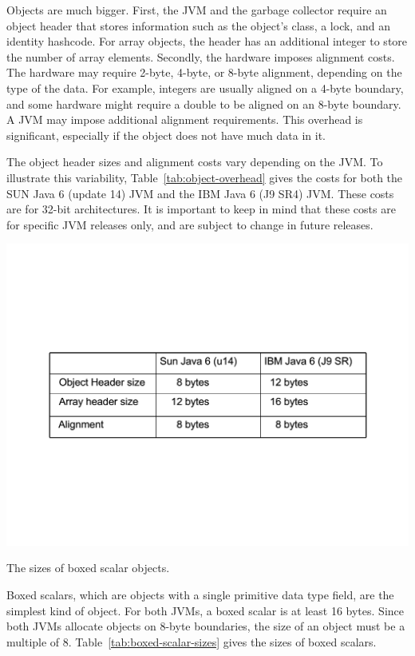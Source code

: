 Objects are much bigger. First, the JVM and the garbage collector require an object header that stores information such as the object's class, a lock, and an identity hashcode. For array objects, the header has an additional integer to store the number of array elements. Secondly, the hardware imposes alignment costs. The hardware may require 2-byte, 4-byte, or 8-byte alignment, depending on the type of the data. For example, integers are usually aligned on a 4-byte boundary, and some hardware might require a double to be aligned on an 8-byte boundary. A JVM may impose additional alignment requirements. This overhead is significant, especially if the object does not have much data in it.

The object header sizes and alignment costs vary depending on the JVM. To illustrate this variability, Table~\ref{tab:object-overhead} gives the costs for both the SUN Java 6 (update 14) JVM and the IBM Java 6 (J9 SR4) JVM. These costs are for 32-bit architectures. It is important to keep in mind that these costs are for specific JVM releases only, and are subject to change in future releases.
\begin{table}
  \centering
 \includegraphics[width=.70\textwidth]{Figures/chapter4/object-overhead.pdf}
  \caption{The sizes of boxed scalar objects.}
  \label{tab:object-overhead}
\end{table} 
 
Boxed scalars, which are objects with a single primitive data type field, are the simplest kind of  object. For both JVMs, a boxed scalar is at least 16 bytes. Since both JVMs allocate objects on 8-byte boundaries, the size of an object must be a multiple of 8. Table~\ref{tab:boxed-scalar-sizes} gives the sizes of boxed scalars.

